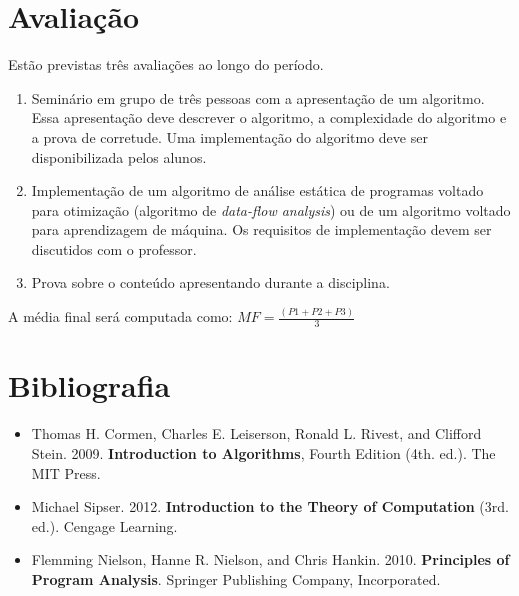 \documentclass[11pt]{article}
\begin{document}
\section{Avalia\c c\~{a}o}

Est\~{a}o previstas tr\^{e}s avalia\c c\~{o}es ao longo do per\'{i}odo.

\begin{enumerate}[P1]

\item Semin\'{a}rio em grupo de tr\^{e}s pessoas com a apresenta\c c\~{a}o
  de um algoritmo. Essa apresenta\c c\~{a}o deve descrever o algoritmo,
  a complexidade do algoritmo e a prova de corretude. Uma implementa\c c\~{a}o do
  algoritmo deve ser disponibilizada pelos alunos.

\item Implementa\c c\~{a}o de um algoritmo de an\'{a}lise est\'{a}tica
  de programas voltado para otimiza\c c\~{a}o (algoritmo de \emph{data-flow
  analysis}) ou de um algoritmo voltado para aprendizagem de m\'{a}quina.
  Os requisitos de implementa\c c\~{a}o devem ser discutidos com o professor.

\item Prova sobre o conte\'{u}do apresentando durante a disciplina.   
\end{enumerate}

A m\'{e}dia final ser\'{a} computada como: $MF = \frac{(P1 + P2 + P3)}{3}$


\section{Bibliografia}

\begin{itemize}

\item Thomas H. Cormen, Charles E. Leiserson, Ronald L. Rivest, and Clifford Stein. 2009. {\bf Introduction to Algorithms}, Fourth Edition (4th. ed.). The MIT Press.

\item Michael Sipser. 2012. {\bf Introduction to the Theory of Computation} (3rd. ed.). Cengage Learning.

\item Flemming Nielson, Hanne R. Nielson, and Chris Hankin. 2010. {\bf Principles of Program Analysis}. Springer Publishing Company, Incorporated.

\end{itemize}
\end{document}
